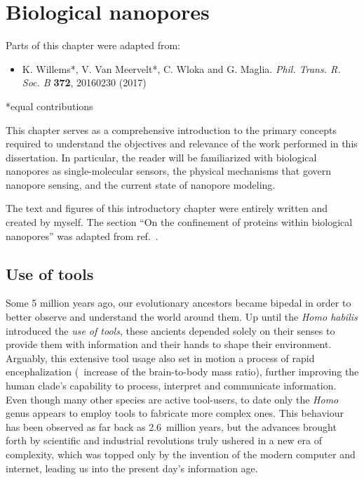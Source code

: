 \chapter{Biological nanopores}
%
\label{ch:nanopores}
%



%
%
\begin{shaded}
Parts of this chapter were adapted from:
%
\begin{itemize}
  \item K. Willems*, V. Van Meervelt*, C. Wloka and G. Maglia.
        \textit{Phil. Trans. R. Soc. B} \textbf{372}, 20160230 (2017) %
\end{itemize}
%
*equal contributions
%
\newpage
\end{shaded}
%
%

%
This chapter serves as a comprehensive introduction to the primary concepts required to understand the
objectives and relevance of the work performed in this dissertation. In particular, the reader will be
familiarized with biological nanopores as single-molecular sensors, the physical mechanisms that govern
nanopore sensing, and the current state of nanopore modeling.
%

%
The text and figures of this introductory chapter were entirely written and created by myself.
%
The section
%
``On the confinement of proteins within biological nanopores''
%
was adapted from ref.~\cite{Willems-VanMeervelt-2017}.



\clearpage

%
%
\section{Use of tools}
%

Some 5 million years ago, our evolutionary ancestors became bipedal in order to better observe and understand
the world around them. Up until the \textit{Homo habilis} introduced the \emph{use of tools}, these ancients
depended solely on their senses to provide them with information and their hands to shape their environment.
Arguably, this extensive tool usage also set in motion a process of rapid encephalization (\ie~increase of the
brain-to-body mass ratio), further improving the human clade's capability to process, interpret and
communicate information. Even though many other species are active tool-users, to date only the \textit{Homo}
genus appears to employ tools to fabricate more complex ones. This behaviour has been observed as far back as
2.6~million years, but the advances brought forth by scientific and industrial revolutions truly ushered in a
new era of complexity, which was topped only by the invention of the modern computer and internet, leading us
into the present day's information age.

